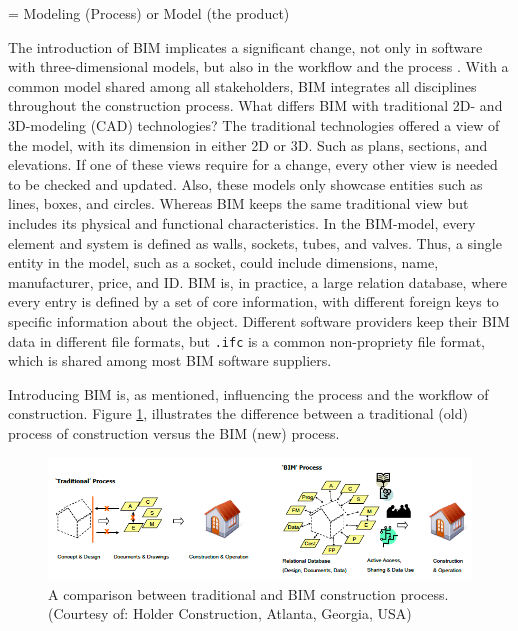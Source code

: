  = Modeling (Process) or Model (the product) 

The introduction of BIM implicates a significant change, not only in software with three-dimensional models, but also in the workflow and the process \cite{azhar2012building}. With a common model shared among all stakeholders, BIM integrates all disciplines throughout the construction process. What differs BIM with traditional 2D- and 3D-modeling (CAD) technologies? The traditional technologies offered a view of the model, with its dimension in either 2D or 3D. Such as plans, sections, and elevations. If one of these views require for a change, every other view is needed to be checked and updated. Also, these models only showcase entities such as lines, boxes, and circles. Whereas BIM keeps the same traditional view but includes its physical and functional characteristics. In the BIM-model, every element and system is defined as walls, sockets, tubes, and valves. Thus, a single entity in the model, such as a socket, could include dimensions, name, manufacturer, price, and ID. BIM is, in practice, a large relation database, where every entry is defined by a set of core information, with different foreign keys to specific information about the object. Different software providers keep their BIM data in different file formats, but \texttt{.ifc} is a common non-propriety file format, which is shared among most BIM software suppliers.

Introducing BIM is, as mentioned, influencing the process and the workflow of construction. Figure \ref{fig:BIM_process}, illustrates the difference between a traditional (old) process of construction versus the BIM (new) process. 

\begin{figure}
    \centering
    \includegraphics[width=\textwidth]{fig/bim_process.png}
    \caption{A comparison between traditional and BIM construction process. (Courtesy of: Holder Construction, Atlanta, Georgia, USA)}
    \label{fig:BIM_process}
\end{figure}

